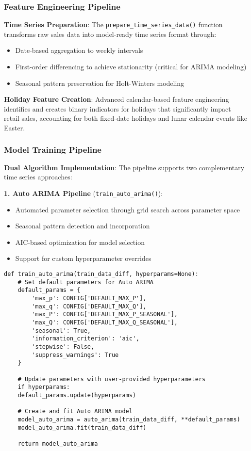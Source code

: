 \subsubsection{Feature Engineering Pipeline}

\textbf{Time Series Preparation}: The \texttt{prepare\_time\_series\_data()} function transforms raw sales data into model-ready time series format through:
\begin{itemize}
	\item Date-based aggregation to weekly intervals
	\item First-order differencing to achieve stationarity (critical for ARIMA modeling)
	\item Seasonal pattern preservation for Holt-Winters modeling
\end{itemize}

\textbf{Holiday Feature Creation}: Advanced calendar-based feature engineering identifies and creates binary indicators for holidays that significantly impact retail sales, accounting for both fixed-date holidays and lunar calendar events like Easter.

\subsubsection{Model Training Pipeline}

\textbf{Dual Algorithm Implementation}: The pipeline supports two complementary time series approaches:

\textbf{1. Auto ARIMA Pipeline} (\texttt{train\_auto\_arima()}):
\begin{itemize}
	\item Automated parameter selection through grid search across parameter space
	\item Seasonal pattern detection and incorporation
	\item AIC-based optimization for model selection
	\item Support for custom hyperparameter overrides
\end{itemize}

\begin{lstlisting}[language=MyPython, caption={Auto ARIMA Training Implementation}]
	def train_auto_arima(train_data_diff, hyperparams=None):
	# Set default parameters for Auto ARIMA
	default_params = {
		'max_p': CONFIG['DEFAULT_MAX_P'],
		'max_q': CONFIG['DEFAULT_MAX_Q'],
		'max_P': CONFIG['DEFAULT_MAX_P_SEASONAL'],
		'max_Q': CONFIG['DEFAULT_MAX_Q_SEASONAL'],
		'seasonal': True,
		'information_criterion': 'aic',
		'stepwise': False,
		'suppress_warnings': True
	}
	
	# Update parameters with user-provided hyperparameters
	if hyperparams:
	default_params.update(hyperparams)
	
	# Create and fit Auto ARIMA model
	model_auto_arima = auto_arima(train_data_diff, **default_params)
	model_auto_arima.fit(train_data_diff)
	
	return model_auto_arima
\end{lstlisting}

